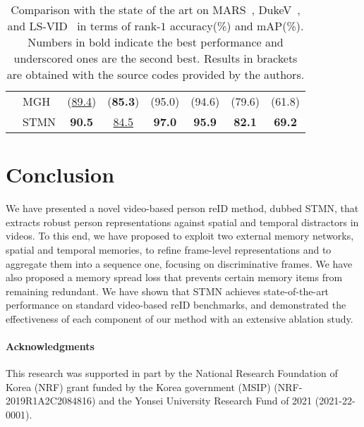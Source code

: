 \documentclass[10pt,twocolumn,letterpaper]{article}
\begin{document}
\begin{table}[!t]
{\begin{tabular}{clcccccc}
				& MGH~\cite{yan2020learning}			& (\underline{89.4}) & (\textbf{85.3}) & (95.0) & (94.6) & (79.6) & (61.8) \\
				& STMN 								& \textbf{90.5} & \underline{84.5} & \textbf{97.0} & \textbf{95.9} & \textbf{82.1} & \textbf{69.2} \\
				\hline
				\end{tabular}
			}
			\vspace{+0.1cm}
			\caption{Comparison with the state of the art on MARS~\cite{zheng2016mars}, DukeV~\cite{wu2018exploit}, and LS-VID~\cite{li2019global} in terms of rank-$1$ accuracy(\%) and mAP(\%). Numbers in bold indicate the best performance and underscored ones are the second best. Results in brackets are obtained with the source codes provided by the authors.}
			\label{table:sota}
			\vspace{-0.4cm}
		\end{table}
								
\section{Conclusion}
\vspace{-0.1cm}
We have presented a novel video-based person reID method, dubbed STMN, that extracts robust person representations against spatial and temporal distractors in videos. To this end, we have proposed to exploit two external memory networks, spatial and temporal memories, to refine frame-level representations and to aggregate them into a sequence one, focusing on discriminative frames. We have also proposed a memory spread loss that prevents certain memory items from remaining redundant. We have shown that STMN achieves state-of-the-art performance on standard video-based reID benchmarks, and demonstrated the effectiveness of each component of our method with an extensive ablation study.

\paragraph{Acknowledgments}
This research was supported in part by the National Research Foundation of Korea (NRF) grant funded by the Korea government (MSIP) (NRF-2019R1A2C2084816) and the Yonsei University Research Fund of 2021 (2021-22-0001).
\newpage

{\small


}
\end{document}
